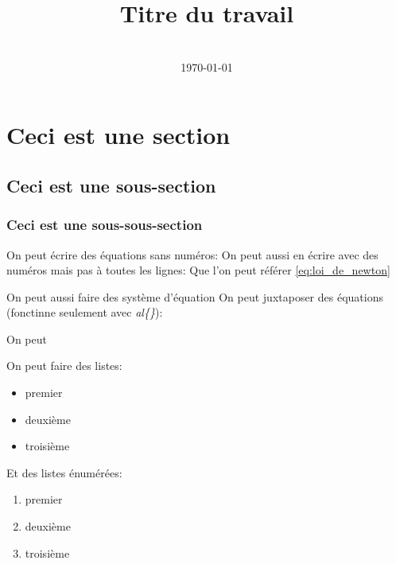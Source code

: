 \documentclass[12pt, a4paper]{article}
\title{Titre du travail}
\author{\JL} %
\date{\US\\ \today} %
\begin{document}
\maketitlepage

\section{Ceci est une section}

\subsection{Ceci est une sous-section}

\subsubsection{Ceci est une sous-sous-section}

On peut écrire des équations sans numéros:
On peut aussi en écrire avec des numéros mais pas à toutes les lignes:
Que l'on peut référer \eqref{eq:loi_de_newton}

On peut aussi faire des système d'équation
On peut juxtaposer des équations (fonctinne seulement avec \textit{al\{\}}):


On peut      

On peut faire des listes:
\begin{itemize}
    \item premier
    \item deuxième
    \item troisième
\end{itemize}

Et des listes énumérées:
\begin{enumerate}
    \item premier
    \item deuxième
    \item troisième
\end{enumerate}
\end{document}
